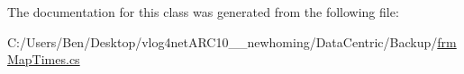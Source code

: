 The documentation for this class was generated from the following file\-:\begin{DoxyCompactItemize}
\item 
C\-:/\-Users/\-Ben/\-Desktop/vlog4net\-A\-R\-C10\-\_\-\_\-newhoming/\-Data\-Centric/\-Backup/\hyperlink{_backup_2frm_map_times_8cs}{frm\-Map\-Times.\-cs}\end{DoxyCompactItemize}
